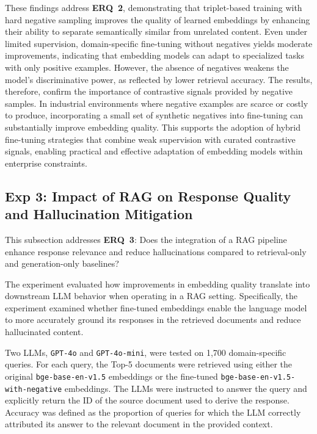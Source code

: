 \documentclass[a4paper,fleqn]{cas-dc}
\renewcommand{\textit}[1]{#1}
\begin{document}
These findings address \textbf{\textit{ERQ~2}}, demonstrating that triplet-based training with hard negative sampling improves the quality of learned embeddings by enhancing their ability to separate semantically similar from unrelated content. Even under limited supervision, domain-specific fine-tuning without negatives yields moderate improvements, indicating that embedding models can adapt to specialized tasks with only positive examples. However, the absence of negatives weakens the model’s discriminative power, as reflected by lower retrieval accuracy. The results, therefore, confirm the importance of contrastive signals provided by negative samples. In industrial environments where negative examples are scarce or costly to produce, incorporating a small set of synthetic negatives into fine-tuning can substantially improve embedding quality. This supports the adoption of hybrid fine-tuning strategies that combine weak supervision with curated contrastive signals, enabling practical and effective adaptation of embedding models within enterprise constraints.

\subsection{Exp 3: Impact of RAG on Response Quality and Hallucination Mitigation}

This subsection addresses \textbf{\textit{ERQ~3}}: Does the integration of a RAG pipeline enhance response relevance and reduce hallucinations compared to retrieval-only and generation-only baselines?

The experiment evaluated how improvements in embedding quality translate into downstream LLM behavior when operating in a RAG setting. Specifically, the experiment examined whether fine-tuned embeddings enable the language model to more accurately ground its responses in the retrieved documents and reduce hallucinated content.

Two LLMs, \texttt{GPT-4o} and \texttt{GPT-4o-mini}, were tested on 1,700 domain-specific queries. For each query, the Top-5 documents were retrieved using either the original \texttt{bge-base-en-v1.5} embeddings or the fine-tuned \texttt{bge-base-en-v1.5-with-negative} embeddings. The LLMs were instructed to answer the query and explicitly return the ID of the source document used to derive the response. Accuracy was defined as the proportion of queries for which the LLM correctly attributed its answer to the relevant document in the provided context.
\end{document}
